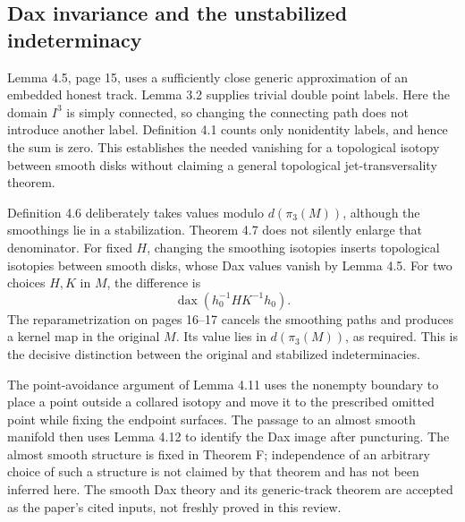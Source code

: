 \documentclass[10pt]{article}
\begin{document}
\subsection*{Dax invariance and the unstabilized indeterminacy}
Lemma 4.5, page 15, uses a sufficiently close generic approximation of an embedded honest track. Lemma 3.2 supplies trivial double point labels. Here the domain \(I^3\) is simply connected, so changing the connecting path does not introduce another label. Definition 4.1 counts only nonidentity labels, and hence the sum is zero. This establishes the needed vanishing for a topological isotopy between smooth disks without claiming a general topological jet-transversality theorem.\par
Definition 4.6 deliberately takes values modulo \(d(\pi_3(M))\), although the smoothings lie in a stabilization. Theorem 4.7 does not silently enlarge that denominator. For fixed \(H\), changing the smoothing isotopies inserts topological isotopies between smooth disks, whose Dax values vanish by Lemma 4.5. For two choices \(H,K\) in \(M\), the difference is \[\operatorname{dax}(h_0^{-1}HK^{-1}h_0).\] The reparametrization on pages 16–17 cancels the smoothing paths and produces a kernel map in the original \(M\). Its value lies in \(d(\pi_3(M))\), as required. This is the decisive distinction between the original and stabilized indeterminacies.\par
The point-avoidance argument of Lemma 4.11 uses the nonempty boundary to place a point outside a collared isotopy and move it to the prescribed omitted point while fixing the endpoint surfaces. The passage to an almost smooth manifold then uses Lemma 4.12 to identify the Dax image after puncturing. The almost smooth structure is fixed in Theorem F; independence of an arbitrary choice of such a structure is not claimed by that theorem and has not been inferred here. The smooth Dax theory and its generic-track theorem are accepted as the paper’s cited inputs, not freshly proved in this review.\par
\end{document}

